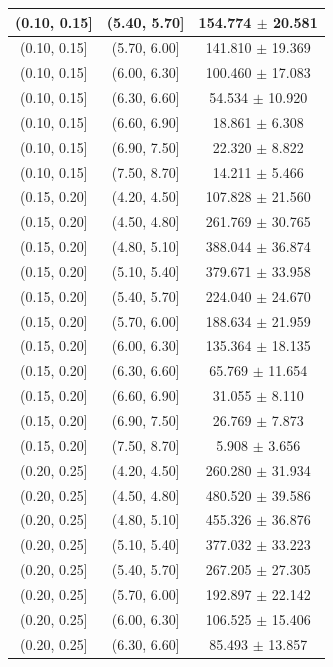 \begin{longtable}{|c|c|c|}
\hline
(0.10, 0.15] & (5.40, 5.70] & 154.774 $\pm$ 20.581 \\ 
\hline
(0.10, 0.15] & (5.70, 6.00] & 141.810 $\pm$ 19.369 \\ 
\hline
(0.10, 0.15] & (6.00, 6.30] & 100.460 $\pm$ 17.083 \\ 
\hline
(0.10, 0.15] & (6.30, 6.60] & 54.534 $\pm$ 10.920 \\ 
\hline
(0.10, 0.15] & (6.60, 6.90] & 18.861 $\pm$ 6.308 \\ 
\hline
(0.10, 0.15] & (6.90, 7.50] & 22.320 $\pm$ 8.822 \\ 
\hline
(0.10, 0.15] & (7.50, 8.70] & 14.211 $\pm$ 5.466 \\ 
\hline
(0.15, 0.20] & (4.20, 4.50] & 107.828 $\pm$ 21.560 \\ 
\hline
(0.15, 0.20] & (4.50, 4.80] & 261.769 $\pm$ 30.765 \\ 
\hline
(0.15, 0.20] & (4.80, 5.10] & 388.044 $\pm$ 36.874 \\ 
\hline
(0.15, 0.20] & (5.10, 5.40] & 379.671 $\pm$ 33.958 \\ 
\hline
(0.15, 0.20] & (5.40, 5.70] & 224.040 $\pm$ 24.670 \\ 
\hline
(0.15, 0.20] & (5.70, 6.00] & 188.634 $\pm$ 21.959 \\ 
\hline
(0.15, 0.20] & (6.00, 6.30] & 135.364 $\pm$ 18.135 \\ 
\hline
(0.15, 0.20] & (6.30, 6.60] & 65.769 $\pm$ 11.654 \\ 
\hline
(0.15, 0.20] & (6.60, 6.90] & 31.055 $\pm$ 8.110 \\ 
\hline
(0.15, 0.20] & (6.90, 7.50] & 26.769 $\pm$ 7.873 \\ 
\hline
(0.15, 0.20] & (7.50, 8.70] & 5.908 $\pm$ 3.656 \\ 
\hline
(0.20, 0.25] & (4.20, 4.50] & 260.280 $\pm$ 31.934 \\ 
\hline
(0.20, 0.25] & (4.50, 4.80] & 480.520 $\pm$ 39.586 \\ 
\hline
(0.20, 0.25] & (4.80, 5.10] & 455.326 $\pm$ 36.876 \\ 
\hline
(0.20, 0.25] & (5.10, 5.40] & 377.032 $\pm$ 33.223 \\ 
\hline
(0.20, 0.25] & (5.40, 5.70] & 267.205 $\pm$ 27.305 \\ 
\hline
(0.20, 0.25] & (5.70, 6.00] & 192.897 $\pm$ 22.142 \\ 
\hline
(0.20, 0.25] & (6.00, 6.30] & 106.525 $\pm$ 15.406 \\ 
\hline
(0.20, 0.25] & (6.30, 6.60] & 85.493 $\pm$ 13.857 \\ 

\end{longtable}
